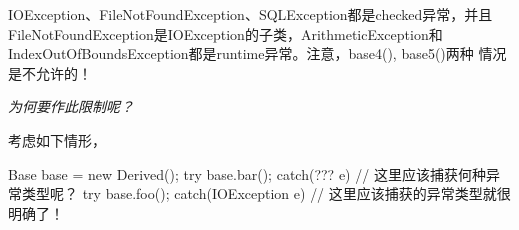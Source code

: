 IOException、FileNotFoundException、SQLException都是checked异常，并且
FileNotFound\-Exception是IOException的子类，ArithmeticException和
IndexOutOfBoundsException都是runtime异常。注意，base4(), base5()两种
情况是不允许的！

\emph{为何要作此限制呢？}

考虑如下情形，

\begin{javacode}
Base base = new Derived();
try {
  base.bar();
} catch(??? e) {
  // 这里应该捕获何种异常类型呢？
}
try {
  base.foo();
} catch(IOException e) {
  // 这里应该捕获的异常类型就很明确了！
}
\end{javacode}